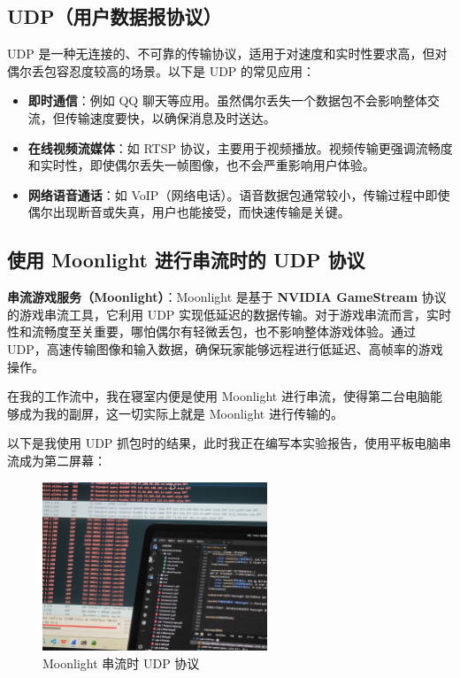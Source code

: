 \documentclass[14pt,a4paper,UTF8,twoside]{article}
\begin{document}
\subsection*{UDP（用户数据报协议）}
UDP 是一种无连接的、不可靠的传输协议，适用于对速度和实时性要求高，但对偶尔丢包容忍度较高的场景。以下是 UDP 的常见应用：
\begin{itemize}
    \item \textbf{即时通信}：例如 QQ 聊天等应用。虽然偶尔丢失一个数据包不会影响整体交流，但传输速度要快，以确保消息及时送达。
    \item \textbf{在线视频流媒体}：如 RTSP 协议，主要用于视频播放。视频传输更强调流畅度和实时性，即使偶尔丢失一帧图像，也不会严重影响用户体验。
    \item \textbf{网络语音通话}：如 VoIP（网络电话）。语音数据包通常较小，传输过程中即使偶尔出现断音或失真，用户也能接受，而快速传输是关键。
\end{itemize}

\subsection*{使用 Moonlight 进行串流时的 UDP 协议}

\textbf{串流游戏服务（Moonlight）}：Moonlight 是基于 \textbf{NVIDIA GameStream} 协议的游戏串流工具，它利用 UDP 实现低延迟的数据传输。对于游戏串流而言，实时性和流畅度至关重要，哪怕偶尔有轻微丢包，也不影响整体游戏体验。通过 UDP，高速传输图像和输入数据，确保玩家能够远程进行低延迟、高帧率的游戏操作。

在我的工作流中，我在寝室内便是使用 Moonlight 进行串流，使得第二台电脑能够成为我的副屏，这一切实际上就是 Moonlight 进行传输的。

以下是我使用 UDP 抓包时的结果，此时我正在编写本实验报告，使用平板电脑串流成为第二屏幕：

\begin{figure}[H]
    \centering
    \includegraphics[width=0.6\textwidth]{lab5/pad.png}
    \caption{Moonlight 串流时 UDP 协议}
\end{figure}
\end{document}
